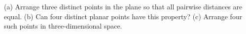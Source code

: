 (a) Arrange three distinct points in the plane so that all pairwise distances are equal. (b) Can four distinct planar points have this property? (c) Arrange four such points in three-dimensional space.
